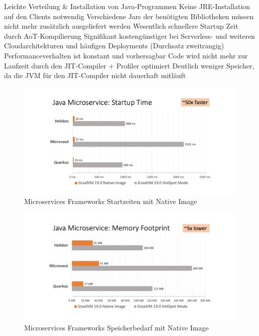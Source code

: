 Leichte Verteilung \& Installation von Java-Programmen
Keine JRE-Installation auf den Clients notwendig
Verschiedene Jars der benötigten Bibliotheken müssen nicht mehr zusätzlich ausgeliefert werden
Wesentlich schnellere Startup Zeit durch AoT-Kompilierung
Signifikant kostengünstiger bei Serverless- und weiteren Cloudarchitekturen und häufigen Deployments (Durchsatz zweitrangig)
Performanceverhalten ist konstant und vorhersagbar
Code wird nicht mehr zur Laufzeit durch den JIT-Compiler + Profiler optimiert
Deutlich weniger Speicher, da die JVM für den JIT-Compiler nicht dauerhaft mitläuft

\newpage
\begin{figure}[h]
	\centering
	\includegraphics[width=.9\textwidth]{resources/ms_startup_time.png}
	\caption{Microservices Frameworks Startzeiten mit Native Image \parencite{GraalVMBenchmarks}}
	\label{fig:system_startuptime}
\end{figure}
\begin{figure}[h]
	\centering
	\includegraphics[width=.9\textwidth]{resources/ms_memory_footprint.png}
	\caption{Microservices Frameworks Speicherbedarf mit Native Image \parencite{GraalVMBenchmarks}}
	\label{fig:system_memory_footprint}
\end{figure}


